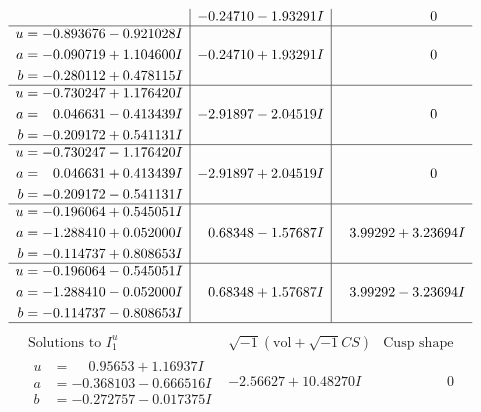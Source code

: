 \documentclass[1p]{elsarticle_modified}
\theoremstyle{definition}
\newcommand{\I}{\sqrt{-1}}
\begin{document}
$$\begin{array}{c|c|c}
 & -0.24710 - 1.93291 I & \phantom{-0.000000 } 0 \\ \hline\begin{aligned}
u &= -0.893676 - 0.921028 I \\
a &= -0.090719 + 1.104600 I \\
b &= -0.280112 + 0.478115 I\end{aligned}
 & -0.24710 + 1.93291 I & \phantom{-0.000000 } 0 \\ \hline\begin{aligned}
u &= -0.730247 + 1.176420 I \\
a &= \phantom{-}0.046631 - 0.413439 I \\
b &= -0.209172 + 0.541131 I\end{aligned}
 & -2.91897 - 2.04519 I & \phantom{-0.000000 } 0 \\ \hline\begin{aligned}
u &= -0.730247 - 1.176420 I \\
a &= \phantom{-}0.046631 + 0.413439 I \\
b &= -0.209172 - 0.541131 I\end{aligned}
 & -2.91897 + 2.04519 I & \phantom{-0.000000 } 0 \\ \hline\begin{aligned}
u &= -0.196064 + 0.545051 I \\
a &= -1.288410 + 0.052000 I \\
b &= -0.114737 + 0.808653 I\end{aligned}
 & \phantom{-}0.68348 - 1.57687 I & \phantom{-}3.99292 + 3.23694 I \\ \hline\begin{aligned}
u &= -0.196064 - 0.545051 I \\
a &= -1.288410 - 0.052000 I \\
b &= -0.114737 - 0.808653 I\end{aligned}
 & \phantom{-}0.68348 + 1.57687 I & \phantom{-}3.99292 - 3.23694 I\\
 \hline 
 \end{array}$$\newpage$$\begin{array}{c|c|c}  
\text{Solutions to }I^u_{1}& \I (\text{vol} + \sqrt{-1}CS) & \text{Cusp shape}\\
 \hline 
\begin{aligned}
u &= \phantom{-}0.95653 + 1.16937 I \\
a &= -0.368103 - 0.666516 I \\
b &= -0.272757 - 0.017375 I\end{aligned}
 & -2.56627 + 10.48270 I & \phantom{-0.000000 } 0 \\ \hline\begin{aligned}

\end{aligned}
\end{array}$$
\end{document}
